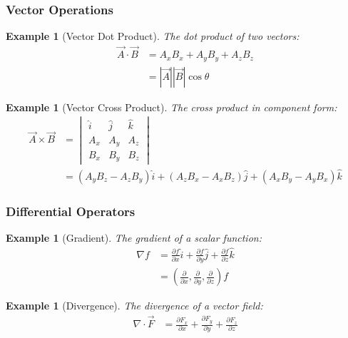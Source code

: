 \documentclass{article}
\newtheorem{example}[theorem]{Example}
\begin{document}
\subsubsection{Vector Operations}
\begin{example}[Vector Dot Product]
The dot product of two vectors:
\begin{align*}
    \vec{A} \cdot \vec{B} &= A_x B_x + A_y B_y + A_z B_z \\
    &= |\vec{A}||\vec{B}|\cos\theta
\end{align*}
\end{example}

\begin{example}[Vector Cross Product]
The cross product in component form:
\begin{align*}
    \vec{A} \times \vec{B} &= \begin{vmatrix}
        \hat{i} & \hat{j} & \hat{k} \\
        A_x & A_y & A_z \\
        B_x & B_y & B_z
    \end{vmatrix} \\
    &= (A_y B_z - A_z B_y)\hat{i} + (A_z B_x - A_x B_z)\hat{j} + (A_x B_y - A_y B_x)\hat{k}
\end{align*}
\end{example}

\subsubsection{Differential Operators}
\begin{example}[Gradient]
The gradient of a scalar function:
\begin{align*}
    \nabla f &= \frac{\partial f}{\partial x}\hat{i} + \frac{\partial f}{\partial y}\hat{j} + \frac{\partial f}{\partial z}\hat{k} \\
    &= \left(\frac{\partial}{\partial x}, \frac{\partial}{\partial y}, \frac{\partial}{\partial z}\right)f
\end{align*}
\end{example}

\begin{example}[Divergence]
The divergence of a vector field:
\begin{align*}
    \nabla \cdot \vec{F} &= \frac{\partial F_x}{\partial x} + \frac{\partial F_y}{\partial y} + \frac{\partial F_z}{\partial z}
\end{align*}
\end{example}
\end{document}
